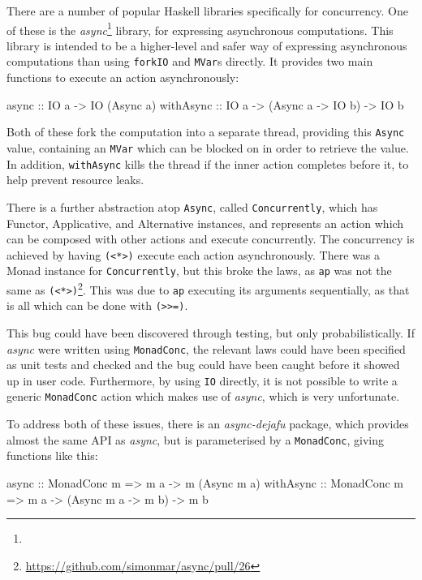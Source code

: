 There are a number of popular Haskell libraries specifically for
concurrency. One of these is the
\emph{async}\footnote{} library, for expressing
asynchronous computations. This library is intended to be a
higher-level and safer way of expressing asynchronous computations
than using \verb|forkIO| and \verb|MVar|s directly. It provides two
main functions to execute an action asynchronously:

\begin{haskellcode}
async :: IO a -> IO (Async a)
withAsync :: IO a -> (Async a -> IO b) -> IO b
\end{haskellcode}

Both of these fork the computation into a separate thread, providing
this \verb|Async| value, containing an \verb|MVar| which can be
blocked on in order to retrieve the value. In addition,
\verb|withAsync| kills the thread if the inner action completes before
it, to help prevent resource leaks.

There is a further abstraction atop \verb|Async|, called
\verb|Concurrently|, which has Functor, Applicative, and Alternative
instances, and represents an action which can be composed with other
actions and execute concurrently. The concurrency is achieved by
having \verb|(<*>)| execute each action asynchronously. There was a
Monad instance for \verb|Concurrently|, but this broke the laws, as
\verb|ap| was not the same as
\verb|(<*>)|\footnote{\url{https://github.com/simonmar/async/pull/26}}. This
was due to \verb|ap| executing its arguments sequentially, as that is
all which can be done with \verb|(>>=)|.

This bug could have been discovered through testing, but only
probabilistically. If \emph{async} were written using
\verb|MonadConc|, the relevant laws could have been specified as unit
tests and checked and the bug could have been caught before it showed
up in user code. Furthermore, by using \verb|IO| directly, it is not
possible to write a generic \verb|MonadConc| action which makes use of
\emph{async}, which is very unfortunate.

To address both of these issues, there is an \emph{async-dejafu}
package, which provides almost the same API as \emph{async}, but is
parameterised by a \verb|MonadConc|, giving functions like this:

\begin{haskellcode}
async :: MonadConc m => m a -> m (Async m a)
withAsync :: MonadConc m => m a -> (Async m a -> m b) -> m b
\end{haskellcode}


